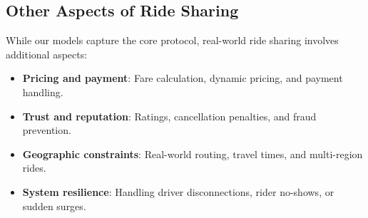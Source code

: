 \documentclass[11pt]{article}
\begin{document}
\subsection{Other Aspects of Ride Sharing}

While our models capture the core protocol, real-world ride sharing involves additional aspects:
\begin{itemize}[leftmargin=1.5em]
  \item \textbf{Pricing and payment}: Fare calculation, dynamic pricing, and payment handling.
  \item \textbf{Trust and reputation}: Ratings, cancellation penalties, and fraud prevention.
  \item \textbf{Geographic constraints}: Real-world routing, travel times, and multi-region rides.
  \item \textbf{System resilience}: Handling driver disconnections, rider no-shows, or sudden surges.
\end{itemize}
\end{document}
